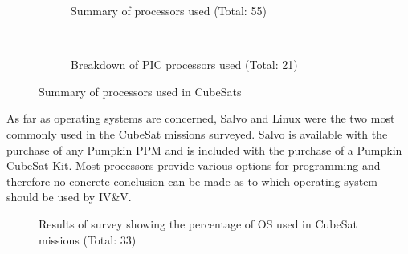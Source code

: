 \documentclass[11pt]{article}
\begin{document}
\begin{figure}[h!]
    \centering
    \begin{subfigure}[t]{0.5\textwidth}
        \centering
        \caption{Summary of processors used (Total: 55)}
    \end{subfigure}%
    ~ 
    \begin{subfigure}[t]{0.5\textwidth}
        \centering
        \caption{Breakdown of PIC processors used (Total: 21)}
    \end{subfigure}
    \caption{Summary of processors used in CubeSats}
		\label{processors}
\end{figure}

As far as operating systems are concerned, Salvo and Linux were the two most commonly used in the CubeSat missions surveyed.  Salvo is available with the purchase of any Pumpkin PPM and is included with the purchase of a Pumpkin CubeSat Kit.  Most processors provide various options for programming and therefore no concrete conclusion can be made as to which operating system should be used by IV\&V.

\begin{figure}[ht!]
\centering
{}
\caption{Results of survey showing the percentage of OS used in CubeSat missions (Total: 33)}
\label{OS}
\end{figure}
\end{document}
